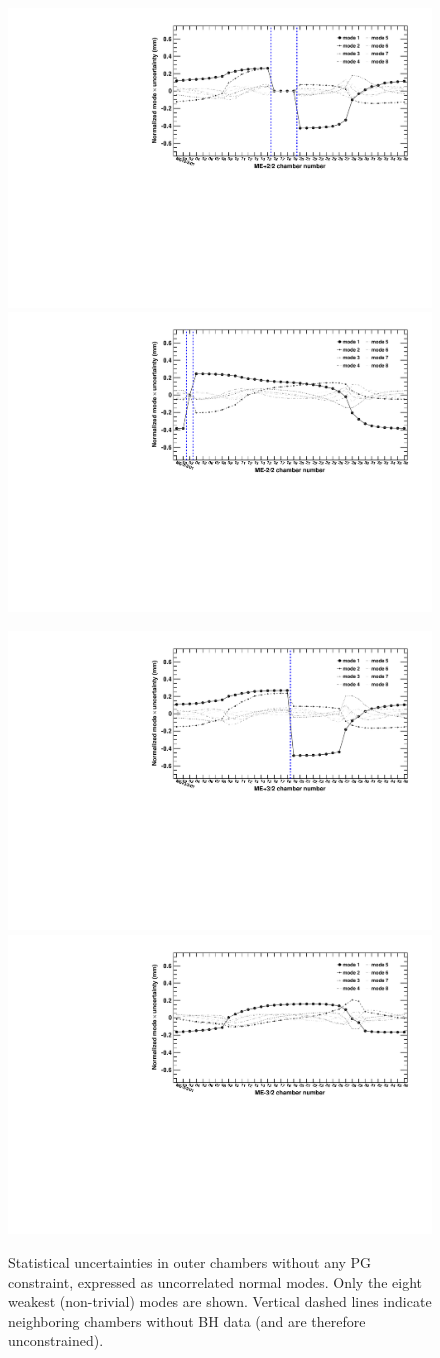 \documentclass[12pt]{article}
\begin{document}
\begin{figure}
\begin{center}
\includegraphics[width=0.45\linewidth]{uncertainties_noPG_mep22.pdf}
\includegraphics[width=0.45\linewidth]{uncertainties_noPG_mem22.pdf}

\includegraphics[width=0.45\linewidth]{uncertainties_noPG_mep32.pdf}
\includegraphics[width=0.45\linewidth]{uncertainties_noPG_mem32.pdf}
\end{center}

\caption{Statistical uncertainties in outer chambers without any PG
  constraint, expressed as uncorrelated normal modes.  Only the eight
  weakest (non-trivial) modes are shown.  Vertical dashed lines
  indicate neighboring chambers without BH data (and are therefore
  unconstrained).  \label{fig:uncertainties_noPG_mep32}}
\end{figure}
\end{document}
